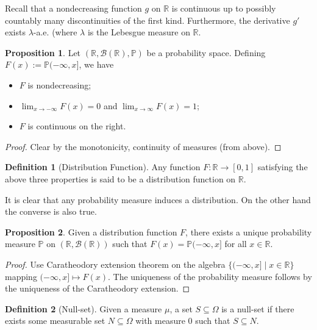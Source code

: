 \documentclass[]{article}
\theoremstyle{definition}
\theoremstyle{definition}
\newtheorem{definition}{Definition}[section]
\newtheorem{proposition}{Proposition}[section]
\begin{document}
Recall that a nondecreasing function \(g\) on \(\mathbb{R}\) is continuous 
up to possibly countably many discontinuities of the first kind. Furthermore, 
the derivative \(g'\) exists \(\lambda\)-a.e. (where \(\lambda\) is the Lebesgue 
measure on \(\mathbb{R}\).

\begin{proposition}
  Let \((\mathbb{R}, \mathcal{B}(\mathbb{R}), \mathbb{P})\) be a probability space. 
  Defining \(F(x) := \mathbb{P}(-\infty, x]\), we have 
  \begin{itemize}
    \item \(F\) is nondecreasing;
    \item \(\lim_{x \to -\infty} F(x) = 0\) and \(\lim_{x \to \infty}F(x) = 1\);
    \item \(F\) is continuous on the right.
  \end{itemize}
\end{proposition}
\begin{proof}
  Clear by the monotonicity, continuity of measures (from above).
\end{proof}

\begin{definition}[Distribution Function]
  Any function \(F : \mathbb{R} \to [0, 1]\) satisfying the above three properties 
  is said to be a distribution function on \(\mathbb{R}\).
\end{definition}

It is clear that any probability measure induces a distribution. On the other hand 
the converse is also true.

\begin{proposition}
  Given a distribution function \(F\), there exists a unique probability measure 
  \(\mathbb{P}\) on \((\mathbb{R}, \mathcal{B}(\mathbb{R}))\)
  such that \(F(x) = \mathbb{P}(-\infty, x]\) for all \(x \in \mathbb{R}\).
\end{proposition}
\begin{proof}
  Use Caratheodory extension theorem on the algebra \(\{(-\infty, x] \mid x \in \mathbb{R}\}\) 
  mapping \((-\infty, x] \mapsto F(x)\). The uniqueness of the probability measure 
  follows by the uniqueness of the Caratheodory extension.
\end{proof}

\begin{definition}[Null-set]
  Given a measure \(\mu\), a set \(S \subseteq \Omega\) is a null-set if there 
  exists some measurable set \(N \subseteq \Omega\) with measure 0 such that \(S \subseteq N\).
\end{definition}
\end{document}
